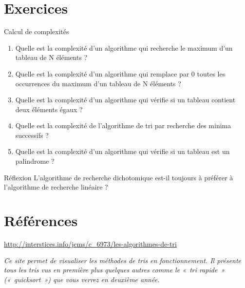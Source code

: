 \section{	Exercices}

	\begin{Exercice}{Calcul de complexités}
			
			\begin{enumerate}[label=\alph*)]
				\item 
					Quelle est la complexité d'un algorithme qui recherche
					le maximum d'un tableau de N éléments ?
				\item 
					Quelle est la complexité d'un algorithme qui remplace
					par 0 toutes les occurrences du maximum d'un tableau
					de N éléments ?
				\item 
					Quelle est la complexité d'un algorithme qui vérifie si
					un tableau contient deux éléments égaux ?
				\item 
					Quelle est la complexité de l'algorithme de tri par
					recherche des minima successifs ?
				\item 
					Quelle est la complexité d'un algorithme qui vérifie si
					un tableau est un palindrome ?
			\end{enumerate}
		\end{Exercice}
		
		\begin{Exercice}{Réflexion}
				L’algorithme de recherche dichotomique est-il toujours à préférer à
				l’algorithme de recherche linéaire ?
		\end{Exercice}


\section{Références}

	\liststyleListv
	\begin{liste}
		\item {
			\url{http://interstices.info/jcms/c_6973/les-algorithmes-de-tri}

			\textit{Ce site permet de visualiser les méthodes de tris en
			fonctionnement. Il présente tous les tris vus en première plus quelques
			autres comme le «~tri rapide~» («~quicksort~») que vous verrez en
			deuxième année. }}
	\end{liste}
